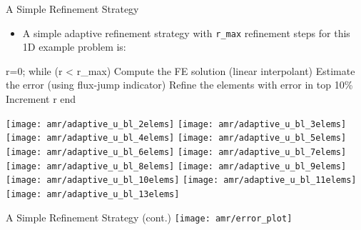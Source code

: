 \begin{frame}[fragile]{A Simple Refinement Strategy}

  \begin{itemize}
    \item A simple adaptive refinement strategy with \texttt{r\_max} refinement steps
      for this 1D example problem is:
  \end{itemize}


\small
\begin{semiverbatim}
r=0;
while (r < r_max)
  Compute the FE solution (linear interpolant)
  Estimate the error (using flux-jump indicator)
  Refine the elements with error in top 10\%
  Increment r
end
\end{semiverbatim}
\end{frame}


\begin{frame}
   {  \texttt{[image: amr/adaptive\_u\_bl\_2elems]} }
   {  \texttt{[image: amr/adaptive\_u\_bl\_3elems]} }
   {  \texttt{[image: amr/adaptive\_u\_bl\_4elems]} }
   {  \texttt{[image: amr/adaptive\_u\_bl\_5elems]} }
   {  \texttt{[image: amr/adaptive\_u\_bl\_6elems]} }
   {  \texttt{[image: amr/adaptive\_u\_bl\_7elems]} }
   {  \texttt{[image: amr/adaptive\_u\_bl\_8elems]} }
   {  \texttt{[image: amr/adaptive\_u\_bl\_9elems]} }
   {  \texttt{[image: amr/adaptive\_u\_bl\_10elems]} }
   {  \texttt{[image: amr/adaptive\_u\_bl\_11elems]} }
   {  \texttt{[image: amr/adaptive\_u\_bl\_13elems]} }
\end{frame}



\begin{frame}{A Simple Refinement Strategy (cont.)}
  \texttt{[image: amr/error\_plot]}
\end{frame}


